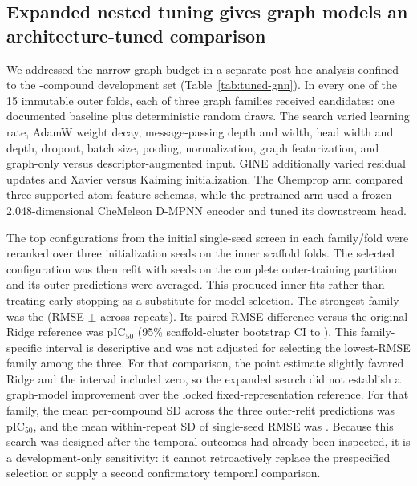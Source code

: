 \documentclass[11pt]{article}
\begin{document}
\subsection{Expanded nested tuning gives graph models an architecture-tuned comparison}

We addressed the narrow graph budget in a separate post hoc analysis confined
to the \DevelopmentCount{}-compound development set (Table~\ref{tab:tuned-gnn}). In every one of
the 15 immutable outer folds, each of three graph families received
\TunedGNNCandidateBudget{} candidates: one documented baseline plus
\TunedGNNRandomDrawCount{} deterministic random draws. The search varied
learning rate, AdamW weight decay, message-passing depth and width, head width
and depth, dropout, batch size, pooling, normalization, graph featurization, and
graph-only versus descriptor-augmented input. GINE additionally varied residual
updates and Xavier versus Kaiming initialization. The Chemprop arm compared
three supported atom feature schemas, while the pretrained arm used a frozen
2,048-dimensional CheMeleon D-MPNN encoder and tuned its downstream head.

The top \TunedGNNRerankCount{} configurations from the initial single-seed screen
in each family/fold were reranked over three initialization seeds on the inner
scaffold folds. The selected configuration was then refit with
\TunedGNNSeedCount{} seeds on the complete
outer-training partition and its outer predictions were averaged. This produced
\TunedGNNInnerFitCount{} inner fits rather than treating early stopping as a
substitute for model selection. The strongest family was the
\TunedGNNBestModelText{} (RMSE \TunedGNNBestRMSE{} $\pm$
\TunedGNNBestRMSESD{} across repeats). Its paired RMSE difference versus the
original Ridge reference was \TunedGNNBestDelta{} pIC$_{50}$ (95\%
scaffold-cluster bootstrap CI \TunedGNNBestDeltaLower{} to
\TunedGNNBestDeltaUpper{}). This family-specific interval is descriptive and
was not adjusted for selecting the lowest-RMSE family among the three. For that
comparison, the point estimate slightly favored Ridge and the interval included
zero, so the expanded search did not establish a graph-model improvement over
the locked fixed-representation reference. For that
family, the mean per-compound SD across the three outer-refit predictions was
\TunedGNNBestMeanPredictionSeedSD{}
pIC$_{50}$, and the mean within-repeat SD of single-seed RMSE was
\TunedGNNBestWithinRepeatSeedRMSESD{}. Because this search was designed after
the temporal outcomes had already been inspected, it is a development-only
sensitivity: it cannot retroactively replace the prespecified selection or
supply a second confirmatory temporal comparison.
\end{document}
